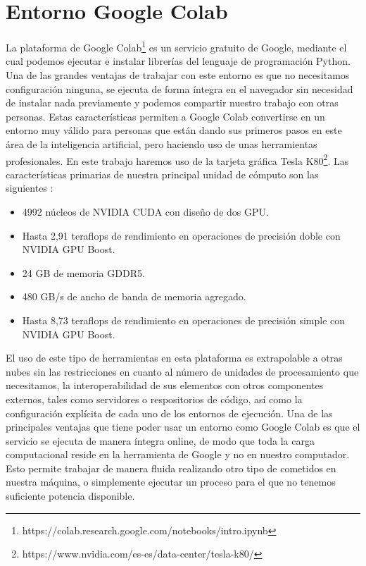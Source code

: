 \section{Entorno Google Colab}\label{sec:entorno-google-colab}
La plataforma de Google Colab\footnote{https://colab.research.google.com/notebooks/intro.ipynb} es un servicio gratuito de Google, mediante el cual podemos ejecutar e instalar librerías del lenguaje de programación Python.
Una de las grandes ventajas de trabajar con este entorno es que no necesitamos configuración ninguna, se ejecuta de forma íntegra en el navegador sin necesidad de instalar nada previamente y podemos compartir
nuestro trabajo con otras personas.
Estas características permiten a Google Colab convertirse en un entorno muy válido para personas que están dando sus primeros pasos en este área de la inteligencia artificial, pero haciendo uso
de unas herramientas profesionales.
En este trabajo haremos uso de la tarjeta gráfica Tesla K80\footnote{https://www.nvidia.com/es-es/data-center/tesla-k80/}.
Las características primarias de nuestra principal unidad de cómputo son las siguientes :
\begin{itemize}
    \item 4992 núcleos de NVIDIA CUDA con diseño de dos GPU\@.
    \item Hasta 2,91 teraflops de rendimiento en operaciones de precisión doble con NVIDIA GPU Boost.
    \item 24 GB de memoria GDDR5.
    \item 480 GB/s de ancho de banda de memoria agregado.
    \item Hasta 8,73 teraflops de rendimiento en operaciones de precisión simple con NVIDIA GPU Boost.
\end{itemize}
El uso de este tipo de herramientas en esta plataforma es extrapolable a otras nubes sin las restricciones en cuanto al número de unidades de procesamiento que necesitamos, la interoperabilidad de sus elementos con otros componentes externos, tales como servidores o respositorios de código, así como la configuración explícita de cada uno de los entornos de ejecución.
Una de las principales ventajas que tiene poder usar un entorno como Google Colab es que el servicio se ejecuta de manera íntegra online, de modo que toda la carga computacional reside en la herramienta de Google y no en nuestro computador.
Esto permite trabajar de manera fluida realizando otro tipo de cometidos en nuestra máquina, o simplemente ejecutar un proceso para el que no tenemos suficiente potencia disponible.
